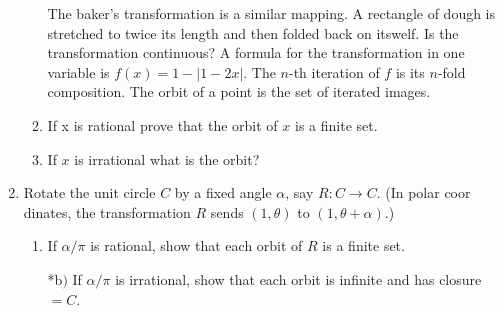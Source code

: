 \documentclass[11pt, a4paper, latinreim, shortsets]{notes}
\begin{document}
\begin{enumerate}[label={\bfseries 2.\arabic*}]
\begin{enumerate}[label=\alph*)]
			The baker's transformation is a similar mapping. A rectangle of dough is stretched to twice its
			length and then folded back on itswelf. Is the transformation continuous? A formula for the
			transformation in one variable is $f(x) = 1 - |1-2x|$. The $n$-th iteration of $f$ is its $n$-fold
			composition. The orbit of a point is the set of iterated images.
		\item If x is rational prove that the orbit of $x$ is a finite set.
		\item If $x$ is irrational what is the orbit?
	\end{enumerate}

	\item Rotate the unit circle $C$ by a fixed angle $\alpha$, say $R : C \to C$. (In polar coor
	dinates, the transformation $R$ sends $(1,\theta)$ to $(1,\theta + \alpha)$.)
	\begin{enumerate}[label=\alph*)]
		\item If $\alpha/\pi$ is rational, show that each orbit of $R$ is a finite set.
		\item[*b$)$] If $\alpha / \pi$ is irrational, show that each orbit is infinite and has closure $=C$.
	\end{enumerate}
\end{enumerate}
\end{document}
